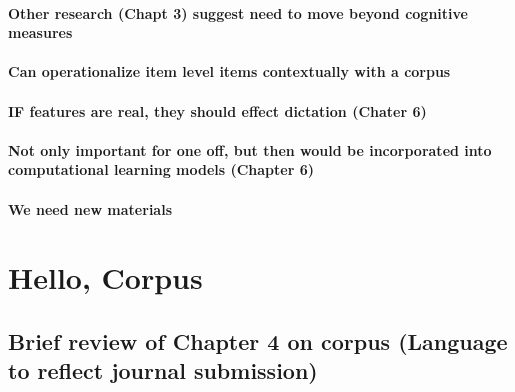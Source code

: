 \documentclass[]{book}
\theoremstyle{definition}
\theoremstyle{definition}
\theoremstyle{definition}
\theoremstyle{remark}
\begin{document}
\hypertarget{other-research-chapt-3-suggest-need-to-move-beyond-cognitive-measures}{%
\subsubsection{Other research (Chapt 3) suggest need to move beyond
cognitive
measures}\label{other-research-chapt-3-suggest-need-to-move-beyond-cognitive-measures}}

\hypertarget{can-operationalize-item-level-items-contextually-with-a-corpus}{%
\subsubsection{Can operationalize item level items contextually with a
corpus}\label{can-operationalize-item-level-items-contextually-with-a-corpus}}

\hypertarget{if-features-are-real-they-should-effect-dictation-chater-6}{%
\subsubsection{IF features are real, they should effect dictation
(Chater
6)}\label{if-features-are-real-they-should-effect-dictation-chater-6}}

\hypertarget{not-only-important-for-one-off-but-then-would-be-incorporated-into-computational-learning-models-chapter-6}{%
\subsubsection{Not only important for one off, but then would be
incorporated into computational learning models (Chapter
6)}\label{not-only-important-for-one-off-but-then-would-be-incorporated-into-computational-learning-models-chapter-6}}

\hypertarget{we-need-new-materials}{%
\subsubsection{We need new materials}\label{we-need-new-materials}}

\hypertarget{hello-corpus}{%
\chapter{Hello, Corpus}\label{hello-corpus}}

\hypertarget{brief-review-of-chapter-4-on-corpus-language-to-reflect-journal-submission}{%
\section{Brief review of Chapter 4 on corpus (Language to reflect
journal
submission)}\label{brief-review-of-chapter-4-on-corpus-language-to-reflect-journal-submission}}
\end{document}
